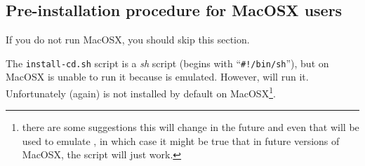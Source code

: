 \documentclass{article}
\begin{document}
\subsection[Pre-installation procedure for MacOSX users]
{Pre-installation procedure for MacOSX users}
If you do not run MacOSX, you should skip this section.

The \texttt{install-cd.sh} script is a \emph{sh} script (begins with 
``\verb=#!/bin/sh=''), but
on MacOSX  is unable to run it because 
 is 
emulated. However,  will run it. Unfortunately (again) 
 is not 
installed by default on MacOSX\footnote{there are some suggestions this will 
change in the future and even 
that  will be used to emulate ,
in which case it might be true 
that in future versions of MacOSX, the script will just work.}.
\end{document}
